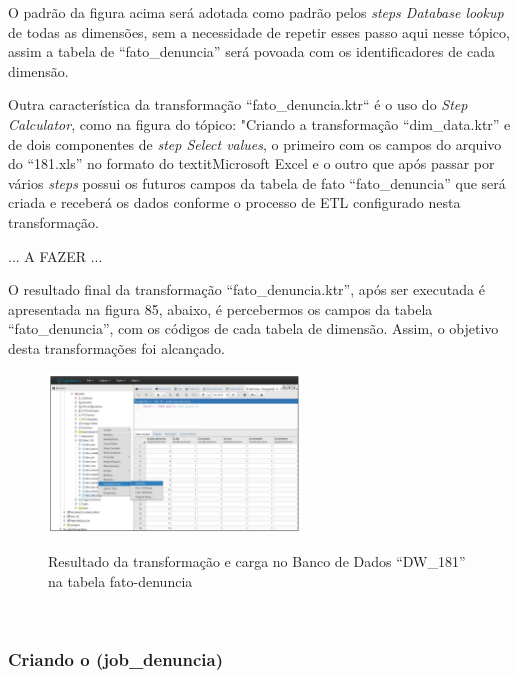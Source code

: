 O padr\~{a}o da figura acima ser\'{a} adotada como padr\~{a}o pelos \textit{steps Database lookup} de todas as dimens\~{o}es, sem a necessidade de repetir esses passo aqui nesse t\'opico, assim a tabela de ``fato\_denuncia'' ser\'{a} povoada com os identificadores de cada dimens\~{a}o.

Outra característica da transforma\c{c}\~{a}o ``fato\_denuncia.ktr`` \'{e} o uso do \textit{Step Calculator}, como na figura do t\'opico: "Criando a transforma\c{c}\~{a}o ``dim\_data.ktr'' e  de dois componentes de \textit{step Select values}, o primeiro com os campos do arquivo do ``181.xls'' no formato do textit{Microsoft Excel} e o outro que ap\'os passar por v\'{a}rios \textit{steps} possui os futuros campos da tabela de fato 
``fato\_denuncia'' que ser\'{a} criada e receber\'{a} os dados conforme o processo de ETL configurado nesta transforma\c{c}\~{a}o.

... A FAZER ...

O resultado final da transforma\c{c}\~{a}o ``fato\_denuncia.ktr'', ap\'os ser executada \'{e} apresentada na figura 85, abaixo, \'{e} percebermos os campos da tabela ``fato\_denuncia'', com os c\'odigos de cada tabela de dimens\~{a}o.
Assim, o objetivo desta transforma\c{c}\~{o}es foi alcan\c{c}ado.

\begin{figure}[H]
	\vspace*{0,2cm}
    \centering
    \caption{Resultado da transforma\c{c}\~{a}o e carga no Banco de Dados ``DW\_181'' na tabela fato-denuncia}
    \includegraphics[width=0.6\textwidth]{./04-figuras/figura-resultado-fato-denuncia}
    \label{fig:ilustfigresultadofatodenuncia}
\end{figure}
\vspace*{-0,9cm}
{\raggedright {}} \\

\subsubsection{Criando o  (job\_denuncia)}

